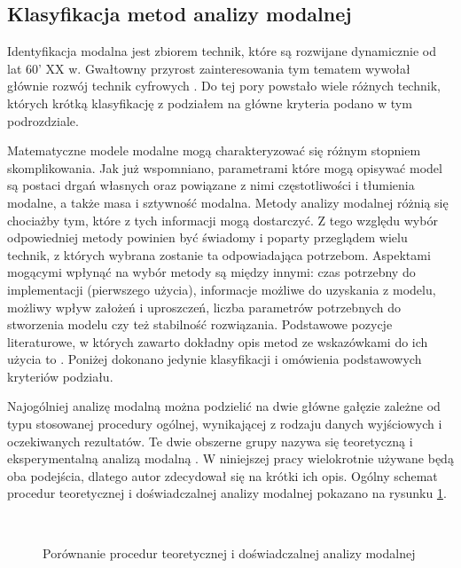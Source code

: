 \subsection{Klasyfikacja metod analizy modalnej}

Identyfikacja modalna jest zbiorem technik, które są rozwijane dynamicznie od lat 60' XX w. Gwałtowny przyrost zainteresowania tym tematem wywołał głównie rozwój technik cyfrowych \parencite{Ewins2000}. Do tej pory powstało wiele różnych technik, których krótką klasyfikację z podziałem na główne kryteria podano w tym podrozdziale.

Matematyczne modele modalne mogą charakteryzować się różnym stopniem skomplikowania. Jak już wspomniano, parametrami które mogą opisywać model są postaci drgań własnych oraz powiązane z nimi częstotliwości i tłumienia modalne, a także masa i sztywność modalna. Metody analizy modalnej różnią się chociażby tym, które z tych informacji mogą dostarczyć. Z tego względu wybór odpowiedniej metody powinien być świadomy i poparty przeglądem wielu technik, z których wybrana zostanie ta odpowiadająca potrzebom. Aspektami mogącymi wpłynąć na wybór metody są między innymi: czas potrzebny do implementacji (pierwszego użycia), informacje możliwe do uzyskania z modelu, możliwy wpływ założeń i uproszczeń, liczba parametrów potrzebnych do stworzenia modelu czy też stabilność rozwiązania. Podstawowe pozycje literaturowe, w których zawarto dokładny opis metod ze wskazówkami do ich użycia to \parencite{Brincker2015,Zhang2004,Maia1997,Ewins2000,Rainieri2014}. Poniżej dokonano jedynie klasyfikacji i omówienia podstawowych kryteriów podziału.

Najogólniej analizę modalną można podzielić na dwie główne gałęzie zależne od typu stosowanej procedury ogólnej, wynikającej z rodzaju danych wyjściowych i oczekiwanych rezultatów. Te dwie obszerne grupy nazywa się teoretyczną i eksperymentalną analizą modalną \parencite{Lengvarsky2013}. W niniejszej pracy wielokrotnie używane będą oba podejścia, dlatego autor zdecydował się na krótki ich opis. Ogólny schemat procedur teoretycznej i doświadczalnej analizy modalnej pokazano na rysunku \ref{fig:theExpProc}.  

\begin{figure}[hbt!]
	\centering
	 \\
	\captionsetup{justification=centering}
	\caption{Porównanie procedur teoretycznej i doświadczalnej analizy modalnej}
	\label{fig:theExpProc}
\end{figure}

